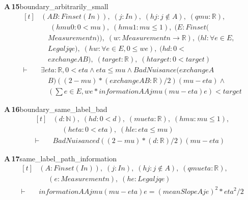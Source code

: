\documentclass[conference]{IEEEtran}
\theoremstyle{definition}
\newcommand{\lean}[1]{\textsf{\footnotesize #1}}
\begin{document}
\noindent\textbf{A\,15}\quad\lean{boundary\_arbitrarily\_small}
{\footnotesize\[ \begin{aligned}[t]
&(\mathit{A} \mathit{B} : \mathit{Finset} (\mathit{I} \mathit{n})),\; (\mathit{j} : \mathit{I} \mathit{n}),\; (\mathit{hj} : \mathit{j} \notin \mathit{A}),\; (\mathit{q} \mathit{mu} : \mathbb{R} ),\\
&\quad \; (\mathit{hmu0} : 0 < \mathit{mu}),\; (\mathit{hmu1} : \mathit{mu} \leq 1),\; (\mathit{E} : \mathit{Finset} (\\
&\quad \mathit{Measurement} \mathit{n})),\; (\mathit{w} : \mathit{Measurement} \mathit{n} \to \mathbb{R} ),\; (\mathit{hl} : \forall \mathit{e} \in \mathit{E},\\
&\quad \mathit{Legal} \mathit{j} \mathit{q} \mathit{e}),\; (\mathit{hw} : \forall \mathit{e} \in \mathit{E}, 0 \leq \mathit{w} \mathit{e}),\; (\mathit{hd} : 0 <\\
&\quad \mathit{exchange} \mathit{A} \mathit{B}),\; (\mathit{target} : \mathbb{R} ),\; (\mathit{htarget} : 0 < \mathit{target})\\
\vdash\;&\exists \mathit{eta} : \mathbb{R} , 0 < \mathit{eta} \wedge \mathit{eta} \leq \mathit{mu} \wedge \mathit{BadNuisance} (\mathit{exchange} \mathit{A}\\
&\quad \mathit{B}) ((2-\mathit{mu})*(\mathit{exchange} \mathit{A} \mathit{B}:\mathbb{R} )/2) (\mathit{mu}-\mathit{eta}) \wedge\\
&\quad (\textstyle\sum \mathit{e} \in \mathit{E},\mathit{w} \mathit{e}*\mathit{information} \mathit{A} \mathit{A} \mathit{j} \mathit{mu} (\mathit{mu}-\mathit{eta}) \mathit{e}) < \mathit{target}
\end{aligned} \]}

\noindent\textbf{A\,16}\quad\lean{boundary\_same\_label\_bad}
{\footnotesize\[ \begin{aligned}[t]
&(\mathit{d} : \mathbb{N} ),\; (\mathit{hd} : 0 < \mathit{d}),\; (\mathit{mu} \mathit{eta} : \mathbb{R} ),\; (\mathit{hmu} : \mathit{mu} \leq 1),\\
&\quad \; (\mathit{heta} : 0 < \mathit{eta}),\; (\mathit{hle} : \mathit{eta} \leq \mathit{mu})\\
\vdash\;&\mathit{BadNuisance} \mathit{d} ((2-\mathit{mu})*(\mathit{d}:\mathbb{R} )/2) (\mathit{mu}-\mathit{eta})
\end{aligned} \]}

\noindent\textbf{A\,17}\quad\lean{same\_label\_path\_information}
{\footnotesize\[ \begin{aligned}[t]
&(\mathit{A} : \mathit{Finset} (\mathit{I} \mathit{n})),\; (\mathit{j} : \mathit{I} \mathit{n}),\; (\mathit{hj} : \mathit{j} \notin \mathit{A}),\; (\mathit{q} \mathit{mu} \mathit{eta} : \mathbb{R} ),\\
&\quad \; (\mathit{e} : \mathit{Measurement} \mathit{n}),\; (\mathit{he} : \mathit{Legal} \mathit{j} \mathit{q} \mathit{e})\\
\vdash\;&\mathit{information} \mathit{A} \mathit{A} \mathit{j} \mathit{mu} (\mathit{mu}-\mathit{eta}) \mathit{e} = (\mathit{meanSlope} \mathit{A} \mathit{j} \mathit{e})^{2}*\mathit{eta}^{2}/2
\end{aligned} \]}
\end{document}
